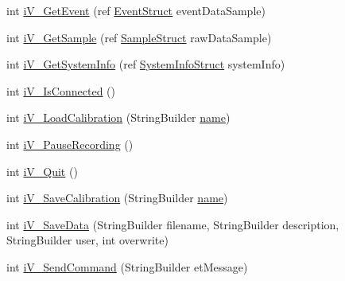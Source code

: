 \begin{DoxyCompactItemize}
\item 
int \hyperlink{class_web_analyzer_1_1_eye_tracking_1_1_eye_tracking_controller_aae1e52bcfe12aae67dbc9a1482492c17}{i\+V\+\_\+\+Get\+Event} (ref \hyperlink{struct_web_analyzer_1_1_eye_tracking_1_1_eye_tracking_controller_1_1_event_struct}{Event\+Struct} event\+Data\+Sample)
\item 
int \hyperlink{class_web_analyzer_1_1_eye_tracking_1_1_eye_tracking_controller_a28b9bf251ab6e459336de3b0df324d74}{i\+V\+\_\+\+Get\+Sample} (ref \hyperlink{struct_web_analyzer_1_1_eye_tracking_1_1_eye_tracking_controller_1_1_sample_struct}{Sample\+Struct} raw\+Data\+Sample)
\item 
int \hyperlink{class_web_analyzer_1_1_eye_tracking_1_1_eye_tracking_controller_a63193d6f6567dfc18b1d4ffe8675325f}{i\+V\+\_\+\+Get\+System\+Info} (ref \hyperlink{struct_web_analyzer_1_1_eye_tracking_1_1_eye_tracking_controller_1_1_system_info_struct}{System\+Info\+Struct} system\+Info)
\item 
int \hyperlink{class_web_analyzer_1_1_eye_tracking_1_1_eye_tracking_controller_a5929e7d4215d7396926176190269bf9f}{i\+V\+\_\+\+Is\+Connected} ()
\item 
int \hyperlink{class_web_analyzer_1_1_eye_tracking_1_1_eye_tracking_controller_a782cd4eba18171c1f4b5269a5d9fb78a}{i\+V\+\_\+\+Load\+Calibration} (String\+Builder \hyperlink{_u_i_2_h_t_m_l_resources_2js_2src_2create__experiment_8js_adac2bcb4f01b574cbc63fe8ee2c56bf0}{name})
\item 
int \hyperlink{class_web_analyzer_1_1_eye_tracking_1_1_eye_tracking_controller_a218ea5be7dca1cb6a408cafe579814fb}{i\+V\+\_\+\+Pause\+Recording} ()
\item 
int \hyperlink{class_web_analyzer_1_1_eye_tracking_1_1_eye_tracking_controller_ae383a91b94a1e9a8de106b15c2eea3f1}{i\+V\+\_\+\+Quit} ()
\item 
int \hyperlink{class_web_analyzer_1_1_eye_tracking_1_1_eye_tracking_controller_ac1c92e4cba3e833d5bb1be00ed887fbb}{i\+V\+\_\+\+Save\+Calibration} (String\+Builder \hyperlink{_u_i_2_h_t_m_l_resources_2js_2src_2create__experiment_8js_adac2bcb4f01b574cbc63fe8ee2c56bf0}{name})
\item 
int \hyperlink{class_web_analyzer_1_1_eye_tracking_1_1_eye_tracking_controller_a545d7c2443bc3394131fa4dfc1f7c26b}{i\+V\+\_\+\+Save\+Data} (String\+Builder filename, String\+Builder description, String\+Builder user, int overwrite)
\item 
int \hyperlink{class_web_analyzer_1_1_eye_tracking_1_1_eye_tracking_controller_aa59e315b1a63767b53dc2605c49f6132}{i\+V\+\_\+\+Send\+Command} (String\+Builder et\+Message)

\end{DoxyCompactItemize}

